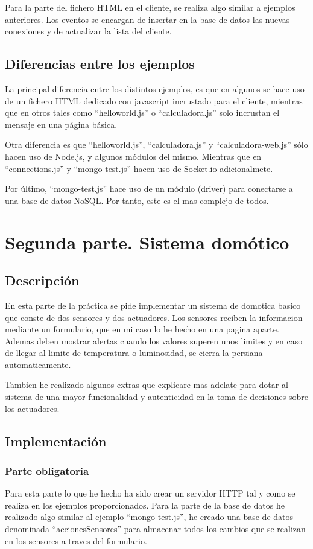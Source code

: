 \documentclass{article}
\begin{document}
Para la parte del fichero HTML en el cliente, se realiza algo similar a ejemplos anteriores. Los eventos se encargan de insertar en la base de datos las nuevas conexiones y de actualizar la lista del cliente.

\subsection{Diferencias entre los ejemplos}
La principal diferencia entre los distintos ejemplos, es que en algunos se hace uso de un fichero HTML dedicado con javascript incrustado para el cliente, mientras que en otros tales como ``helloworld.js'' o ``calculadora.js'' solo incrustan el mensaje en una página básica.

Otra diferencia es que ``helloworld.js'', ``calculadora.js'' y ``calculadora-web.js'' sólo hacen uso de Node.js, y algunos módulos del mismo. Mientras que en ``connections.js'' y ``mongo-test.js'' hacen uso de Socket.io adicionalmete.

Por último, ``mongo-test.js'' hace uso de un módulo (driver) para conectarse a una base de datos NoSQL. Por tanto, este es el mas complejo de todos.
\section{Segunda parte. Sistema domótico}
\subsection{Descripción}
En esta parte de la práctica se pide implementar un sistema de domotica basico que conste de dos sensores y dos actuadores. Los sensores reciben la informacion mediante un formulario, que en mi caso lo he hecho en una pagina aparte. Ademas deben mostrar alertas cuando los valores superen unos limites y en caso de llegar al limite de temperatura o luminosidad, se cierra la persiana automaticamente.

Tambien he realizado algunos extras que explicare mas adelate para dotar al sistema de una mayor funcionalidad y autenticidad en la toma de decisiones sobre los actuadores.

\subsection{Implementación}
\subsubsection{Parte obligatoria}
Para esta parte lo que he hecho ha sido crear un servidor HTTP tal y como se realiza en los ejemplos proporcionados. Para la parte de la base de datos he realizado algo similar al ejemplo ``mongo-test.js'', he creado una base de datos denominada ``accionesSensores'' para almacenar todos los cambios que se realizan en los sensores a traves del formulario.
\end{document}
